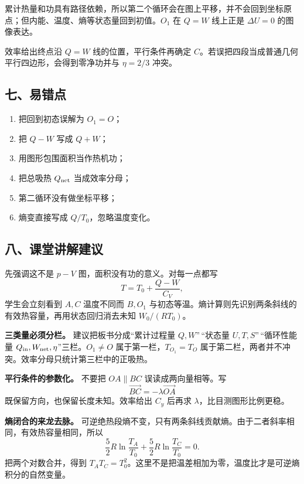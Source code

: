 \documentclass[12pt,a4paper,UTF8]{ctexart}
\newcommand{\tightlist}{\setlength{\itemsep}{0pt}\setlength{\parskip}{0pt}}
\begin{document}
累计热量和功具有路径依赖，所以第二个循环会在图上平移，并不会回到坐标原点；但内能、温度、熵等状态量回到初值。\(O_1\)
在 \(Q=W\) 线上正是 \(\Delta U=0\) 的图像表达。

效率给出终点沿 \(Q=W\) 线的位置，平行条件再确定
\(C\)。若误把四段当成普通几何平行四边形，会得到零净功并与 \(\eta=2/3\)
冲突。

\subsection{七、易错点}\label{ux4e03ux6613ux9519ux70b9-5}

\begin{enumerate}
\def\labelenumi{\arabic{enumi}.}
\tightlist
\item
  把回到初态误解为 \(O_1=O\)；
\item
  把 \(Q-W\) 写成 \(Q+W\)；
\item
  用图形包围面积当作热机功；
\item
  把总吸热 \(Q_{\rm net}\) 当成效率分母；
\item
  第二循环没有做坐标平移；
\item
  熵变直接写成 \(Q/T_0\)，忽略温度变化。
\end{enumerate}

\subsection{八、课堂讲解建议}\label{ux516bux8bfeux5802ux8bb2ux89e3ux5efaux8bae-5}

先强调这不是 \(p-V\) 图，面积没有功的意义。对每一点都写 \[
T=T_0+\frac{Q-W}{C_V},
\] 学生会立刻看到 \(A,C\) 温度不同而 \(B,O_1\)
与初态等温。熵计算则先识别两条斜线的有效热容量，再用状态回归消去未知
\(W_0/(RT_0)\)。

\textbf{三类量必须分栏。} 建议把板书分成``累计过程量 \(Q,W\)''\,``状态量
\(U,T,S\)''\,``循环性能量
\(Q_{\rm in},W_{\rm net},\eta\)''三栏。\(O_1\ne O\)
属于第一栏，\(T_{O_1}=T_O\)
属于第二栏，两者并不冲突。效率分母只统计第三栏中的正吸热。

\textbf{平行条件的参数化。} 不要把 \(OA\parallel BC\)
误读成两向量相等。写 \[
\overrightarrow{BC}=-\lambda\overrightarrow{OA}
\] 既保留方向，也保留长度未知。效率给出 \(C_y\) 后再求
\(\lambda\)，比目测图形比例更稳。

\textbf{熵闭合的来龙去脉。}
可逆绝热段熵不变，只有两条斜线贡献熵。由于二者斜率相同，有效热容量相同，所以
\[
\frac52R\ln\frac{T_A}{T_0}
+\frac52R\ln\frac{T_C}{T_0}=0.
\] 把两个对数合并，得到
\(T_AT_C=T_0^2\)。这里不是把温差相加为零，温度比才是可逆熵积分的自然变量。
\end{document}
